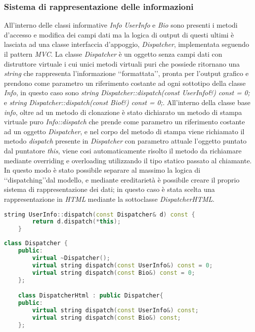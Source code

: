 \subsubsection*{Sistema di rappresentazione delle informazioni}
All'interno delle classi informative \textit{Info} \textit{UserInfo} e \textit{Bio} sono presenti i metodi d'accesso e modifica dei campi dati ma la logica di output
di questi ultimi è lasciata ad una classe interfaccia d'appoggio, \textit{Dispatcher}, implementata seguendo il pattern \textit{MVC}.
La classe \textit{Dispatcher} è un oggetto senza campi dati con distruttore virtuale i cui unici metodi virtuali puri che possiede ritornano una \textit{string} che rappresenta l'informazione \lq\lq formattata\rq\rq,  pronta per l'output grafico
e prendono come parametro un riferimento costante ad ogni sottotipo della classe \textit{Info}, in questo caso sono \textit{string Dispatcher::dispatch(const UserInfo\&) const = 0;} e \textit{string Dispatcher::dispatch(const Bio\&) const = 0;}.
All'interno della classe base \textit{info}, oltre ad un metodo di clonazione è stato dichiarato un metodo di stampa virtuale puro \textit{Info::dispatch} che prende come parametro
un riferimento costante ad un oggetto \textit{Dispatcher}, e nel corpo del metodo di stampa viene richiamato il metodo \textit{dispatch} presente in \textit{Dispatcher} con parametro attuale l'oggetto puntato dal puntatore \textit{this}, viene
cosi automaticamente risolto il metodo da richiamare mediante overriding e overloading utilizzando il tipo statico passato al chiamante.
In questo modo è stato possibile separare al massimo la logica di \lq\lq dispatching\rq\rq dal modello, e mediante ereditarietà è possibile creare il proprio sistema di rappresentazione dei dati; in questo caso è stata scelta una
rappresentazione in \textit{HTML} mediante la sottoclasse \textit{DispatcherHTML}.
\begin{lstlisting}[title=UserInfo.cpp,language=C++]
    string UserInfo::dispatch(const Dispatcher& d) const {
        return d.dispatch(*this);
    }
\end{lstlisting}
\begin{lstlisting}[title=Dispatcher.h,language=C++]
    class Dispatcher {
    public:
        virtual ~Dispatcher();
        virtual string dispatch(const UserInfo&) const = 0;
        virtual string dispatch(const Bio&) const = 0;
    };

    class DispatcherHtml : public Dispatcher{
    public:
        virtual string dispatch(const UserInfo&) const;
        virtual string dispatch(const Bio&) const;
    };
\end{lstlisting}